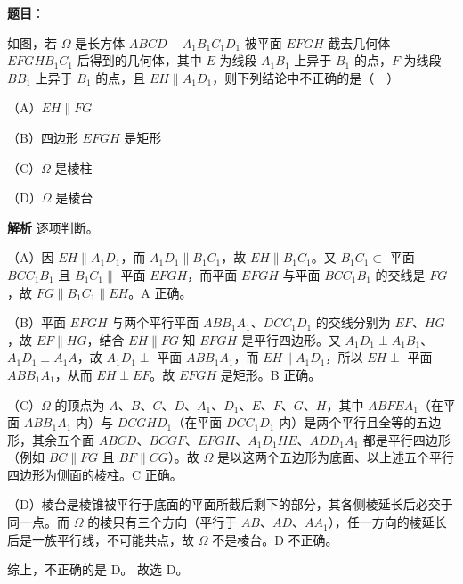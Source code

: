 \begin{answer}

\textbf{题目}：

如图，若 $\Omega$ 是长方体 $ABCD-A_1B_1C_1D_1$ 被平面 $EFGH$ 截去几何体 $EFGHB_1C_1$ 后得到的几何体，其中 $E$ 为线段 $A_1B_1$ 上异于 $B_1$ 的点，$F$ 为线段 $BB_1$ 上异于 $B_1$ 的点，且 $EH\parallel A_1D_1$，则下列结论中不正确的是（　）

（A）$EH\parallel FG$

（B）四边形 $EFGH$ 是矩形

（C）$\Omega$ 是棱柱

（D）$\Omega$ 是棱台
\nopagebreak[4]
\begin{center}\end{center}
\nopagebreak[4]
\textbf{解析}
逐项判断。

（A）因 $EH\parallel A_1D_1$，而 $A_1D_1\parallel B_1C_1$，故 $EH\parallel B_1C_1$。又 $B_1C_1\subset$ 平面 $BCC_1B_1$ 且 $B_1C_1\parallel$ 平面 $EFGH$，而平面 $EFGH$ 与平面 $BCC_1B_1$ 的交线是 $FG$，故 $FG\parallel B_1C_1\parallel EH$。A 正确。

（B）平面 $EFGH$ 与两个平行平面 $ABB_1A_1$、$DCC_1D_1$ 的交线分别为 $EF$、$HG$，故 $EF\parallel HG$，结合 $EH\parallel FG$ 知 $EFGH$ 是平行四边形。又 $A_1D_1\perp A_1B_1$、$A_1D_1\perp A_1A$，故 $A_1D_1\perp$ 平面 $ABB_1A_1$，而 $EH\parallel A_1D_1$，所以 $EH\perp$ 平面 $ABB_1A_1$，从而 $EH\perp EF$。故 $EFGH$ 是矩形。B 正确。

（C）$\Omega$ 的顶点为 $A$、$B$、$C$、$D$、$A_1$、$D_1$、$E$、$F$、$G$、$H$，其中 $ABFEA_1$（在平面 $ABB_1A_1$ 内）与 $DCGHD_1$（在平面 $DCC_1D_1$ 内）是两个平行且全等的五边形，其余五个面 $ABCD$、$BCGF$、$EFGH$、$A_1D_1HE$、$ADD_1A_1$ 都是平行四边形（例如 $BC\parallel FG$ 且 $BF\parallel CG$）。故 $\Omega$ 是以这两个五边形为底面、以上述五个平行四边形为侧面的棱柱。C 正确。

（D）棱台是棱锥被平行于底面的平面所截后剩下的部分，其各侧棱延长后必交于同一点。而 $\Omega$ 的棱只有三个方向（平行于 $AB$、$AD$、$AA_1$），任一方向的棱延长后是一族平行线，不可能共点，故 $\Omega$ 不是棱台。D 不正确。

综上，不正确的是 D。
故选 D。


\end{answer}
